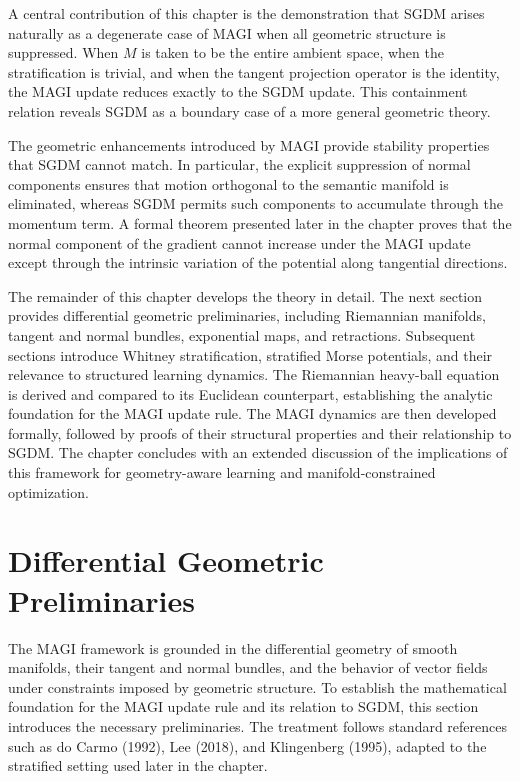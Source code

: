 \documentclass[12pt]{article}
\begin{document}
A central contribution of this chapter is the demonstration that SGDM arises naturally as a degenerate case of MAGI when all geometric structure is suppressed. When $M$ is taken to be the entire ambient space, when the stratification is trivial, and when the tangent projection operator is the identity, the MAGI update reduces exactly to the SGDM update. This containment relation reveals SGDM as a boundary case of a more general geometric theory.

The geometric enhancements introduced by MAGI provide stability properties that SGDM cannot match. In particular, the explicit suppression of normal components ensures that motion orthogonal to the semantic manifold is eliminated, whereas SGDM permits such components to accumulate through the momentum term. A formal theorem presented later in the chapter proves that the normal component of the gradient cannot increase under the MAGI update except through the intrinsic variation of the potential along tangential directions.

The remainder of this chapter develops the theory in detail. The next section provides differential geometric preliminaries, including Riemannian manifolds, tangent and normal bundles, exponential maps, and retractions. Subsequent sections introduce Whitney stratification, stratified Morse potentials, and their relevance to structured learning dynamics. The Riemannian heavy-ball equation is derived and compared to its Euclidean counterpart, establishing the analytic foundation for the MAGI update rule. The MAGI dynamics are then developed formally, followed by proofs of their structural properties and their relationship to SGDM. The chapter concludes with an extended discussion of the implications of this framework for geometry-aware learning and manifold-constrained optimization.

\section{Differential Geometric Preliminaries}

The MAGI framework is grounded in the differential geometry of smooth manifolds, their tangent and normal bundles, and the behavior of vector fields under constraints imposed by geometric structure. To establish the mathematical foundation for the MAGI update rule and its relation to SGDM, this section introduces the necessary preliminaries. The treatment follows standard references such as do Carmo (1992), Lee (2018), and Klingenberg (1995), adapted to the stratified setting used later in the chapter.
\end{document}
